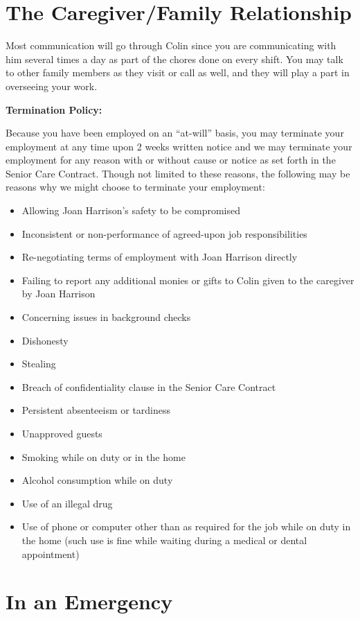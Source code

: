 \documentclass[]{article}
\begin{document}
\section*{The Caregiver/Family Relationship}

Most communication will go through Colin since you are communicating with him several times a day as part of the chores done on every shift. You may talk to other family members as they visit or call as well, and they will play a part in overseeing your work.

\textbf{Termination Policy:}

Because you have been employed on an ``at-will'' basis, you may terminate your employment at any time upon 2 weeks written notice and we may terminate your employment for any reason with or without cause or notice as set forth in the Senior Care Contract. Though not limited to these reasons, the following may be reasons why we might choose to terminate your employment:

\begin{itemize}
\item Allowing Joan Harrison's safety to be compromised
\item Inconsistent or non-performance of agreed-upon job responsibilities
\item Re-negotiating terms of employment with Joan Harrison directly
\item Failing to report any additional monies or gifts to Colin given to the caregiver by Joan Harrison
\item Concerning issues in background checks
\item Dishonesty
\item Stealing
\item Breach of confidentiality clause in the Senior Care Contract
\item Persistent absenteeism or tardiness
\item Unapproved guests
\item Smoking while on duty or in the home
\item Alcohol consumption while on duty
\item Use of an illegal drug
\item Use of phone or computer other than as required for the job while on duty in the home (such use is fine while waiting during a medical or dental appointment)
\end{itemize}

\section*{In an Emergency}
\end{document}
